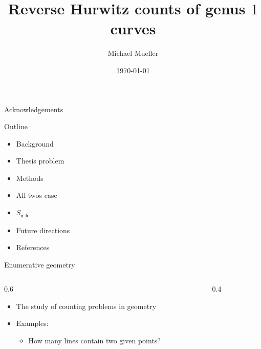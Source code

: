 \documentclass{beamer}
\title{Reverse Hurwitz counts of genus $1$ curves}
\author{Michael Mueller}
\date{\today}
\renewcommand{\a}{\mathfrak a}
\renewcommand{\b}{\mathfrak b}
\theoremstyle{definition}
\begin{document}
    \begin{frame}[plain]
        \maketitle
    \end{frame}

        \begin{frame}{Acknowledgements}
    \end{frame}

    \begin{frame}{Outline}
      \begin{itemize}
      \item Background
      \item Thesis problem
      \item Methods
      \item All twos case
      \item $S_{\a,\b}$
      \item Future directions
        \item References
        \end{itemize}
      \end{frame}

    \begin{frame}{Enumerative geometry}

      \begin{columns}[c]
        \begin{column}{0.6\hsize}
      
          \begin{itemize}
          \item The study of counting problems in geometry
          \item Examples: \begin{itemize}
          \item How many lines contain two given points?
          \end{itemize}
          \end{itemize}
        \end{column}
        \begin{column}{0.4\hsize}

          \centering
          \vspace*{1.2in}
          
        \end{column}
      \end{columns}
    \end{frame}
\end{document}
